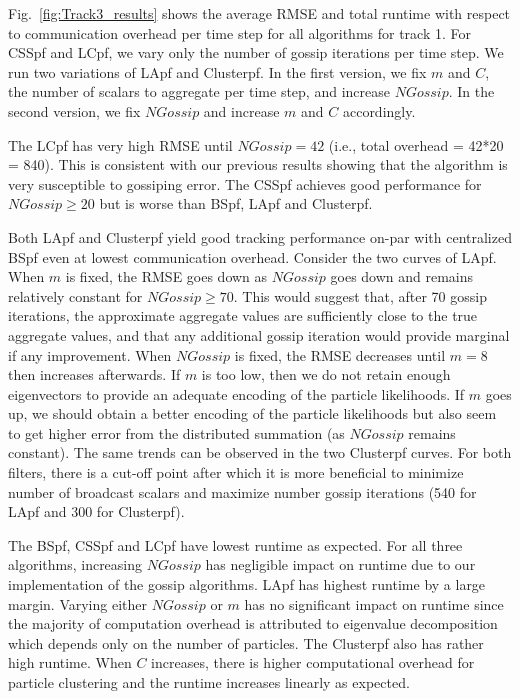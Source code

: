 \documentclass[10pt,letterpaper,final]{article}
\begin{document}
Fig.~\ref{fig:Track3_results} shows the average RMSE and total runtime with respect to communication overhead per time step for all algorithms for track 1. For CSSpf and LCpf, we vary only the number of gossip iterations per time step. We run two variations of LApf and Clusterpf. In the first version, we fix $m$ and $C$, the number of scalars to aggregate per time step, and increase $NGossip$. In the second version, we fix $NGossip$ and increase $m$ and $C$ accordingly. 

The LCpf has very high RMSE until $NGossip=42$ (i.e., total overhead = 42*20 = 840). This is consistent with our previous results showing that the algorithm is very susceptible to gossiping error. The CSSpf achieves good performance for $NGossip\geq 20$ but is worse than BSpf, LApf and Clusterpf. 

Both LApf and Clusterpf yield good tracking performance on-par with centralized BSpf even at lowest communication overhead. Consider the two curves of LApf. When $m$ is fixed, the RMSE goes down as $NGossip$ goes down and remains relatively constant for $NGossip\geq 70$. This would suggest that, after 70 gossip iterations, the approximate aggregate values are sufficiently close to the true aggregate values, and that any additional gossip iteration would provide marginal if any improvement. When $NGossip$ is fixed, the RMSE decreases until $m=8$ then increases afterwards. If $m$ is too low, then we do not retain enough eigenvectors to provide an adequate encoding of the particle likelihoods. If $m$ goes up, we should obtain a better encoding of the particle likelihoods but also seem to get higher error from the distributed summation (as $NGossip$ remains constant). The same trends can be observed in the two Clusterpf curves. For both filters, there is a cut-off point after which it is more beneficial to minimize number of broadcast scalars and maximize number gossip iterations (540 for LApf and 300 for Clusterpf). 

The BSpf, CSSpf and LCpf have lowest runtime as expected. For all three algorithms, increasing $NGossip$ has negligible impact on runtime due to our implementation of the gossip algorithms. LApf has highest runtime by a large margin. Varying either $NGossip$ or $m$ has no significant impact on runtime since the majority of computation overhead is attributed to eigenvalue decomposition which depends only on the number of particles. The Clusterpf also has rather high runtime. When $C$ increases, there is higher computational overhead for particle clustering and the runtime increases linearly as expected.  
\end{document}
